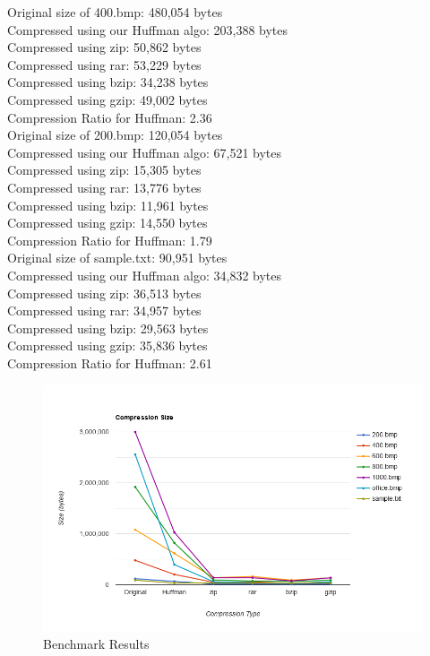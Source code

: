 \documentclass[12pt,letterpaper]{article}
\begin{document}
Original size of 400.bmp: 480,054 bytes \\
Compressed using our Huffman algo: 203,388 bytes \\
Compressed using zip: 50,862 bytes \\
Compressed using rar: 53,229 bytes \\
Compressed using bzip: 34,238 bytes \\
Compressed using gzip: 49,002 bytes \\
Compression Ratio for Huffman: 2.36 \\

Original size of 200.bmp: 120,054 bytes \\
Compressed using our Huffman algo: 67,521 bytes \\
Compressed using zip: 15,305 bytes \\
Compressed using rar: 13,776 bytes \\
Compressed using bzip: 11,961 bytes \\
Compressed using gzip: 14,550 bytes \\
Compression Ratio for Huffman: 1.79 \\

Original size of sample.txt: 90,951 bytes \\
Compressed using our Huffman algo: 34,832 bytes \\
Compressed using zip: 36,513 bytes \\
Compressed using rar: 34,957 bytes \\
Compressed using bzip: 29,563 bytes \\
Compressed using gzip: 35,836 bytes \\
Compression Ratio for Huffman: 2.61 \\

\begin{figure}[!h]
  \centering
  \includegraphics[width=1.0\linewidth]{line-graph.png}
  \caption{Benchmark Results}
  \end{figure}
\end{document}
